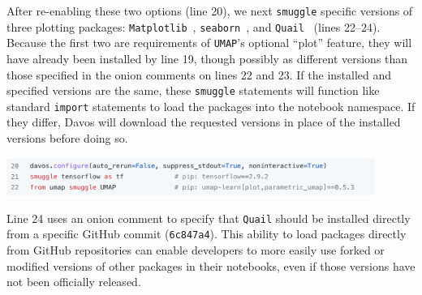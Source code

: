 \documentclass[preprint,12pt,a4paper]{elsarticle}
\begin{document}
After re-enabling these two options (line 20), we next \texttt{smuggle}
specific versions of three plotting packages:
\texttt{Matplotlib}~\cite{Hunt07}, \texttt{seaborn}~\cite{Wask21}, and
\texttt{Quail}~\cite{HeusEtal17} (lines 22--24). Because the first two
are requirements of \texttt{UMAP}'s optional ``plot'' feature, they
will have already been installed by line 19, though possibly as
different versions than those specified in the onion comments on lines
22 and 23. If the installed and specified versions are the same, these
\texttt{smuggle} statements will function like standard \texttt{import}
statements to load the packages into the notebook namespace. If they
differ, Davos will download the requested versions in place
of the installed versions before doing so.
\begin{center}
\includegraphics[width=0.9\textwidth]{figs/example5}
\end{center}
Line 24 uses an onion comment to specify that \texttt{Quail} should be
installed directly from a specific GitHub commit (\texttt{6c847a4}).
This ability to load packages directly from GitHub repositories can
enable developers to more easily use forked or modified versions of other
packages in their notebooks, even if those versions have not been
officially released.
\end{document}
